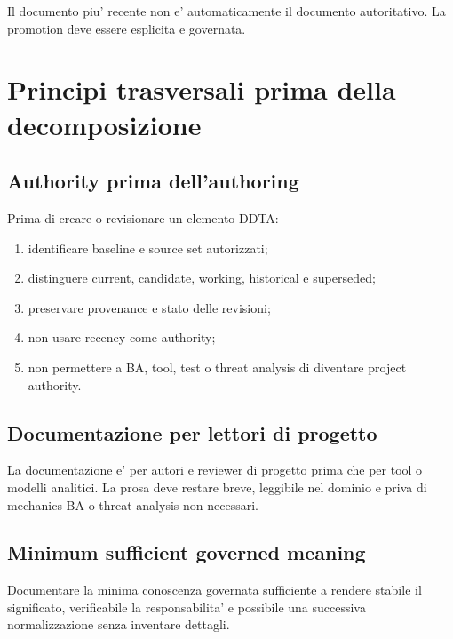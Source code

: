\documentclass[11pt,a4paper]{article}
\begin{document}
\begin{ddtacore}[title={Recency != authority}]
Il documento piu' recente non e' automaticamente il documento autoritativo. La promotion deve essere esplicita e governata.
\end{ddtacore}

\section{Principi trasversali prima della decomposizione}

\subsection{Authority prima dell'authoring}
\closedtag

Prima di creare o revisionare un elemento DDTA:
\begin{enumerate}
  \item identificare baseline e source set autorizzati;
  \item distinguere current, candidate, working, historical e superseded;
  \item preservare provenance e stato delle revisioni;
  \item non usare recency come authority;
  \item non permettere a BA, tool, test o threat analysis di diventare project authority.
\end{enumerate}

\subsection{Documentazione per lettori di progetto}
\layertwotag

La documentazione e' per autori e reviewer di progetto prima che per tool o modelli analitici. La prosa deve restare breve, leggibile nel dominio e priva di mechanics BA o threat-analysis non necessari.

\subsection{Minimum sufficient governed meaning}
\closedtag

\begin{ddtaprinciple}
Documentare la minima conoscenza governata sufficiente a rendere stabile il significato, verificabile la responsabilita' e possibile una successiva normalizzazione senza inventare dettagli.
\end{ddtaprinciple}
\end{document}
